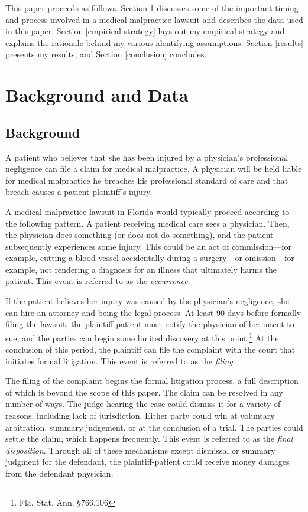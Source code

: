 \documentclass[
  12pt,
]{article}
\begin{document}
This paper proceeds as follows. Section \ref{background-and-data} discusses some of the important timing and process involved in a medical malpractice lawsuit and describes the data used in this paper. Section \ref{empirical-strategy} lays out my empirical strategy and explains the rationale behind my various identifying assumptions. Section \ref{results} presents my results, and Section \ref{conclusion} concludes.

\hypertarget{background-and-data}{%
\section{Background and Data}\label{background-and-data}}

\hypertarget{background}{%
\subsection{Background}\label{background}}

A patient who believes that she has been injured by a physician's professional negligence can file a claim for medical malpractice. A physician will be held liable for medical malpractice he breaches his professional standard of care and that breach causes a patient-plaintiff's injury.

A medical malpractice lawsuit in Florida would typically proceed according to the following pattern. A patient receiving medical care sees a physician. Then, the physician does something (or does not do something), and the patient subsequently experiences some injury. This could be an act of commission---for example, cutting a blood vessel accidentally during a surgery---or omission---for example, not rendering a diagnosis for an illness that ultimately harms the patient. This event is referred to as the \emph{occurrence}.

If the patient believes her injury was caused by the physician's negligence, she can hire an attorney and being the legal process. At least 90 days before formally filing the lawsuit, the plaintiff-patient must notify the physician of her intent to sue, and the parties can begin some limited discovery at this point.\footnote{Fla. Stat. Ann. \S 766.106} At the conclusion of this period, the plaintiff can file the complaint with the court that initiates formal litigation. This event is referred to as the \emph{filing}.

The filing of the complaint begins the formal litigation process, a full description of which is beyond the scope of this paper. The claim can be resolved in any number of ways. The judge hearing the case could dismiss it for a variety of reasons, including lack of jurisdiction. Either party could win at voluntary arbitration, summary judgement, or at the conclusion of a trial. The parties could settle the claim, which happens frequently. This event is referred to as the \emph{final disposition}. Through all of these mechanisms except dismissal or summary judgment for the defendant, the plaintiff-patient could receive money damages from the defendant physician.
\end{document}
